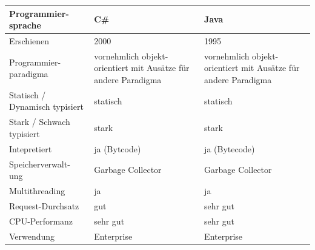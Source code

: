 \begin{table}[H]
    \centering
    \begin{tabular}{|p{3cm}|p{5cm}|p{5cm}|}
    \hline
    \textbf{Programmier- sprache}          & \textbf{C\#}                                                                & \textbf{Java}                                                           \\ \hline\hline
    Erschienen                     & 2000                                                               & 1995                                                           \\ \hline
    Programmier- paradigma \cite{wiki_pl}           & vornehmlich objekt-orientiert mit Ausätze für andere Paradigma     & vornehmlich objekt-orientiert mit Ausätze für andere Paradigma \\ \hline
    Statisch / Dynamisch typisiert \cite{wiki_type} & statisch                                                           & statisch                                                       \\ \hline
    Stark / Schwach typisiert \cite{wiki_type}      & stark                                                              & stark                                                          \\ \hline
    Intepretiert                   & ja (Bytcode)                                                       & ja (Bytecode)                                                  \\ \hline
    Speicherverwalt- ung             & Garbage Collector                                                  & Garbage Collector                                              \\ \hline
    Multithreading                 & ja                                                                 & ja                                                             \\ \hline
    Request-Durchsatz \cite{mihai_benchmark,tandemseven_perf,techempower_benchmark,benchmark_web,medium_awslambda,acloud_awslambda}              & gut                                                                & sehr gut                                                       \\ \hline
    CPU-Performanz \cite{benchmark_game,benchmark_kostya}                & sehr gut                                                           & sehr gut                                                       \\ \hline
    Verwendung                     & Enterprise                                                         & Enterprise                                                     \\ \hline

\end{tabular}
\end{table}
